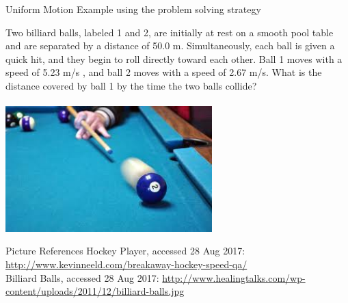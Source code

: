 \documentclass{beamer}
\begin{document}
\begin{frame}{Uniform Motion Example using the problem solving strategy}
\begin{center}
   Two billiard balls, labeled 1 and 2, are initially at rest on a smooth pool table and are separated by a distance of 50.0 m. Simultaneously, each ball is given a quick hit, and they begin to roll directly toward each other. Ball 1 moves with a speed of 5.23 m/s , and ball 2 moves with a speed of 2.67 m/s.
What is the distance covered by ball 1 by the time the two balls collide? \\~\\
   \includegraphics[width=0.6\textwidth]{../figures/billiard-balls1.jpg}
\end{center}
\end{frame}

\begin{frame}{Picture References}
\tiny
Hockey Player, accessed 28 Aug 2017: \href{http://www.kevinneeld.com/breakaway-hockey-speed-qa/}{http://www.kevinneeld.com/breakaway-hockey-speed-qa/}\\
Billiard Balls, accessed 28 Aug 2017: \href{http://www.healingtalks.com/wp-content/uploads/2011/12/billiard-balls.jpg}{http://www.healingtalks.com/wp-content/uploads/2011/12/billiard-balls.jpg}
\end{frame}
\end{document}
